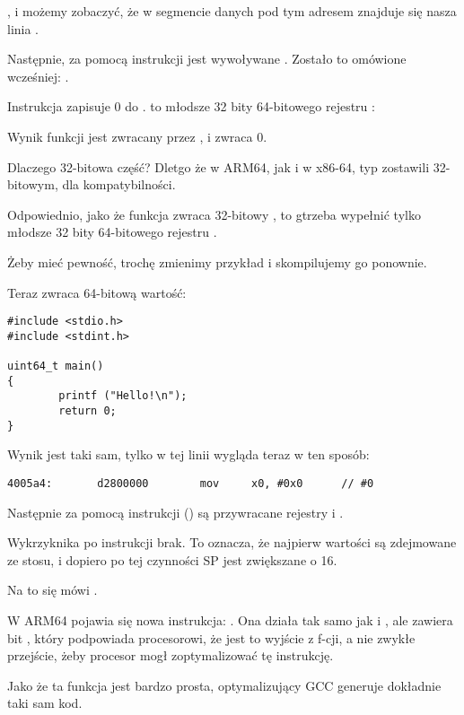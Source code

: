 , i możemy zobaczyć, że w segmencie danych  pod tym adresem znajduje się nasza
linia .

Następnie, za pomocą instrukcji  jest wywoływane \puts. Zostało to omówione wcześniej: .

Instrukcja \MOV zapisuje 0 do . 
 to młodsze 32 bity 64-bitowego rejestru :



Wynik funkcji jest zwracany przez , i \main zwraca 0.

Dlaczego 32-bitowa część?
Dletgo że w ARM64, jak i w x86-64, typ \Tint zostawili 32-bitowym, dla kompatybilności.

Odpowiednio, jako że funkcja zwraca 32-bitowy \Tint, to gtrzeba wypełnić tylko młodsze 32 bity 64-bitowego rejestru .

Żeby mieć pewność, trochę zmienimy przykład i skompilujemy go ponownie.%

Teraz \main zwraca 64-bitową wartość:

\begin{lstlisting}[caption=\main zwracające wartość typu \TT{uint64\_t},style=customc]
#include <stdio.h>
#include <stdint.h>

uint64_t main()
{
        printf ("Hello!\n");
        return 0;
}
\end{lstlisting}

Wynik jest taki sam, tylko \MOV w tej linii wygląda teraz w ten sposób:

\begin{lstlisting}[caption=\NonOptimizing GCC 4.8.1 + objdump]
  4005a4:       d2800000        mov     x0, #0x0      // #0
\end{lstlisting}

Następnie za pomocą instrukcji  () są przywracane rejestry  i .

Wykrzyknika po instrukcji brak. To oznacza, że najpierw wartości są zdejmowane ze stosu, i dopiero po tej czynności \ac{SP} jest zwiększane o 16.

Na to się mówi .

W ARM64 pojawia się nowa instrukcja: \RET. 
Ona działa tak samo jak i , ale zawiera bit ,
który podpowiada procesorowi, że jest to wyjście z f-cji, a nie zwykłe przejście, żeby procesor mogł zoptymalizować tę instrukcję.

Jako że ta funkcja jest bardzo prosta, optymalizujący GCC generuje dokładnie taki sam kod.


